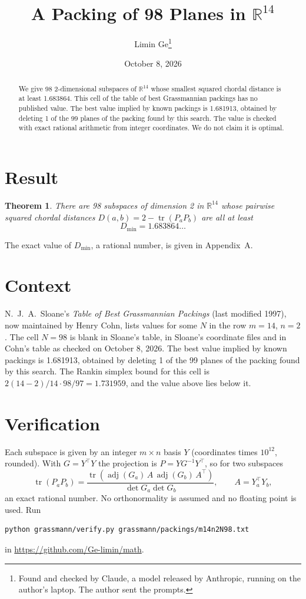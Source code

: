 \documentclass[11pt,a4paper]{article}
\title{A Packing of 98 Planes in $\mathbb{R}^{14}$}
\author{Limin Ge\thanks{Found and checked by Claude, a model released by Anthropic, running on the author's laptop. The author sent the prompts.}}
\date{October 8, 2026}
\newtheorem*{theorem}{Theorem}
\begin{document}
\maketitle
\begin{abstract}
We give 98 2-dimensional subspaces of $\mathbb{R}^{14}$ whose smallest squared chordal distance is at least 1.683864. This cell of the table of best Grassmannian packings has no published value. The best value implied by known packings is 1.681913, obtained by deleting 1 of the 99 planes of the packing found by this search. The value is checked with exact rational arithmetic from integer coordinates. We do not claim it is optimal.
\end{abstract}

\section{Result}
\begin{theorem}
There are 98 subspaces of dimension 2 in $\mathbb{R}^{14}$ whose pairwise squared chordal distances $D(a,b) = 2 - \operatorname{tr}(P_aP_b)$ are all at least
\[ D_{\min} = 1.683864\ldots \]
\end{theorem}
The exact value of $D_{\min}$, a rational number, is given in Appendix~A.


\section{Context}
N.~J.~A.~Sloane's \emph{Table of Best Grassmannian Packings} (last modified 1997), now maintained by Henry Cohn, lists values for some $N$ in the row $m=14$, $n=2$. The cell $N=98$ is blank in Sloane's table, in Sloane's coordinate files and in Cohn's table as checked on October 8, 2026. The best value implied by known packings is 1.681913, obtained by deleting 1 of the 99 planes of the packing found by this search. The Rankin simplex bound for this cell is $2(14-2)/14\cdot 98/97 = 1.731959$, and the value above lies below it.


\section{Verification}
Each subspace is given by an integer $m\times n$ basis $Y$ (coordinates times $10^{12}$, rounded). With $G=Y^\top Y$ the projection is $P=YG^{-1}Y^\top$, so for two subspaces
\[ \operatorname{tr}(P_aP_b)=\frac{\operatorname{tr}(\operatorname{adj}(G_a)\,A\,\operatorname{adj}(G_b)\,A^\top)}{\det G_a\det G_b},\qquad A=Y_a^\top Y_b, \]
an exact rational number. No orthonormality is assumed and no floating point is used. Run
\begin{verbatim}
python grassmann/verify.py grassmann/packings/m14n2N98.txt
\end{verbatim}
in \url{https://github.com/Ge-limin/math}.
\end{document}
